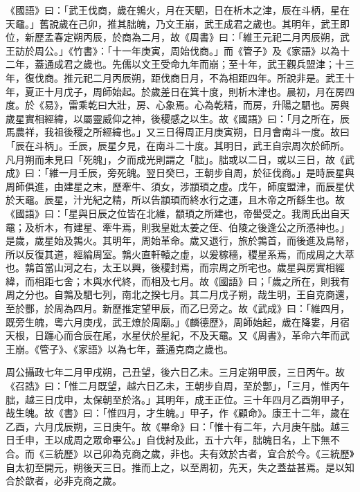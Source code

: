 \begin{pinyinscope}
 《國語》曰：「武王伐商，歲在鶉火，月在天駟，日在析木之津，辰在斗柄，星在天黿。」舊說歲在己卯，推其朏魄，乃文王崩，武王成君之歲也。其明年，武王即位，新歷孟春定朔丙辰，於商為二月，故《周書》曰：「維王元祀二月丙辰朔，武王訪於周公。」《竹書》：「十一年庚寅，周始伐商。」而《管子》及《家語》以為十二年，蓋通成君之歲也。先儒以文王受命九年而崩；至十年，武王觀兵盟津；十三年，復伐商。推元祀二月丙辰朔，距伐商日月，不為相距四年。所說非是。武王十年，夏正十月戊子，周師始起。於歲差日在箕十度，則析木津也。晨初，月在房四度。於《易》，雷乘乾曰大壯，房、心象焉。心為乾精，而房，升陽之駟也。房與歲星實相經緯，以屬靈威仰之神，後稷感之以生。故《國語》曰：「月之所在，辰馬農祥，我祖後稷之所經緯也。」又三日得周正月庚寅朔，日月會南斗一度。故曰「辰在斗柄」。壬辰，辰星夕見，在南斗二十度。其明日，武王自宗周次於師所。凡月朔而未見曰「死魄」，夕而成光則謂之「朏」。朏或以二日，或以三日，故《武成》曰：「維一月壬辰，旁死魄。翌日癸巳，王朝步自周，於征伐商。」是時辰星與周師俱進，由建星之末，歷牽牛、須女，涉顓頊之虛。戊午，師度盟津，而辰星伏於天黿。辰星，汁光紀之精，所以告顓頊而終水行之運，且木帝之所繇生也。故《國語》曰：「星與日辰之位皆在北維，顓頊之所建也，帝嚳受之。我周氏出自天黿；及析木，有建星、牽牛焉，則我皇妣太姜之侄、伯陵之後逢公之所憑神也。」是歲，歲星始及鶉火。其明年，周始革命。歲又退行，旅於鶉首，而後進及鳥帑，所以反復其道，經綸周室。鶉火直軒轅之虛，以爰稼穡，稷星系焉，而成周之大萃也。鶉首當山河之右，太王以興，後稷封焉，而宗周之所宅也。歲星與房實相經緯，而相距七舍；木與水代終，而相及七月。故《國語》曰；「歲之所在，則我有周之分也。自鶉及駟七列，南北之揆七月。其二月戊子朔，哉生明，王自克商還，至於酆，於周為四月。新歷推定望甲辰，而乙巳旁之。故《武成》曰：「維四月，既旁生魄，粵六月庚戌，武王燎於周廟。」《麟德歷》，周師始起，歲在降婁，月宿天根，日躔心而合辰在尾，水星伏於星紀，不及天黿。又《周書》，革命六年而武王崩。《管子》、《家語》以為七年，蓋通克商之歲也。



 周公攝政七年二月甲戌朔，己丑望，後六日乙未。三月定朔甲辰，三日丙午。故《召誥》曰：「惟二月既望，越六日乙未，王朝步自周，至於酆」，「三月，惟丙午朏，越三日戊申，太保朝至於洛。」其明年，成王正位。三十年四月乙酉朔甲子，哉生魄。故《書》曰：「惟四月，才生魄。」甲子，作《顧命》。康王十二年，歲在乙酉，六月戊辰朔，三日庚午。故《畢命》曰：「惟十有二年，六月庚午朏。越三日壬申，王以成周之眾命畢公。」自伐紂及此，五十六年，朏魄日名，上下無不合。而《三統歷》以己卯為克商之歲，非也。夫有效於古者，宜合於今。《三統歷》自太初至開元，朔後天三日。推而上之，以至周初，先天，失之蓋益甚焉。是以知合於歆者，必非克商之歲。




\end{pinyinscope}
